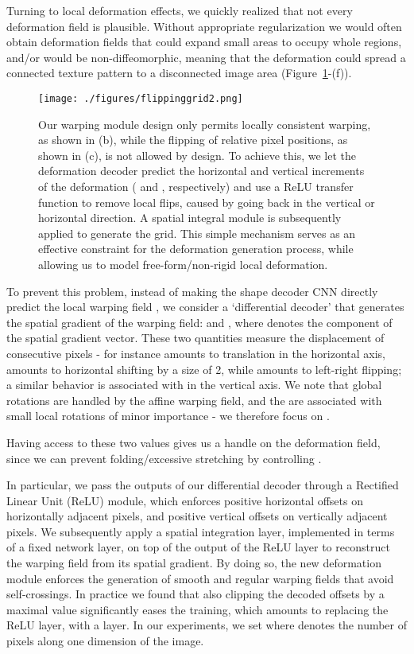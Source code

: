 \documentclass[runningheads]{llncs}
\begin{document}
Turning to local deformation effects, we quickly realized that not every deformation field is plausible. Without appropriate regularization we would often obtain deformation fields that could expand small areas to occupy whole regions, and/or would be non-diffeomorphic, meaning that the deformation could spread a connected texture pattern to a disconnected image area (Figure~\ref{fig:gradient}-(f)). 

\begin{figure}
    \centering
    \texttt{[image: ./figures/flippinggrid2.png]}
    \caption{Our warping module design only permits locally consistent warping, as shown in (b), while the flipping of  relative pixel positions, as shown in (c), is not allowed by design. 
    To achieve this, we  let the deformation decoder predict the horizontal and vertical increments of the deformation ( and , respectively) and use a ReLU transfer function to remove local flips, caused by going back in the vertical or horizontal direction. A spatial integral module is subsequently applied to generate the grid. This simple mechanism
    serves as an effective constraint for the deformation generation process, while allowing us to model free-form/non-rigid local deformation. }
    \label{fig:gradient}
     \vspace{-0.3cm}
\end{figure}

\label{integral}
To prevent this problem, instead of making the shape decoder CNN directly predict the local warping field , we consider a `differential decoder' that generates the spatial gradient of the warping field:  and , where  denotes the  component of the spatial gradient vector.   These two quantities measure the displacement of consecutive pixels -  for instance   amounts to translation in the horizontal axis,  amounts to horizontal shifting by a size of 2, while  amounts to left-right flipping;  a similar behavior is associated with  in the vertical axis.   We note that global rotations are handled by the affine warping field, and the  are associated with small local rotations of minor importance - we therefore focus on .

Having access to these two values gives us a handle on the deformation field, since we can prevent folding/excessive stretching by controlling . 

In particular, we pass the outputs of our differential decoder through a Rectified Linear Unit (ReLU) module, which enforces positive horizontal offsets on horizontally adjacent pixels,
and positive vertical offsets on vertically adjacent pixels. 
We subsequently apply a spatial integration layer, implemented in terms of a fixed network layer, on top of the output of the ReLU layer to reconstruct the warping field from its spatial gradient. By doing so, the new deformation module enforces the generation of smooth and regular warping fields that avoid self-crossings.  
In practice we found that also clipping  the decoded offsets by a maximal value significantly eases the training, which amounts to replacing the ReLU layer,  with a   layer. In our experiments, we set  where  denotes the number of pixels along one dimension of the image.
\end{document}
